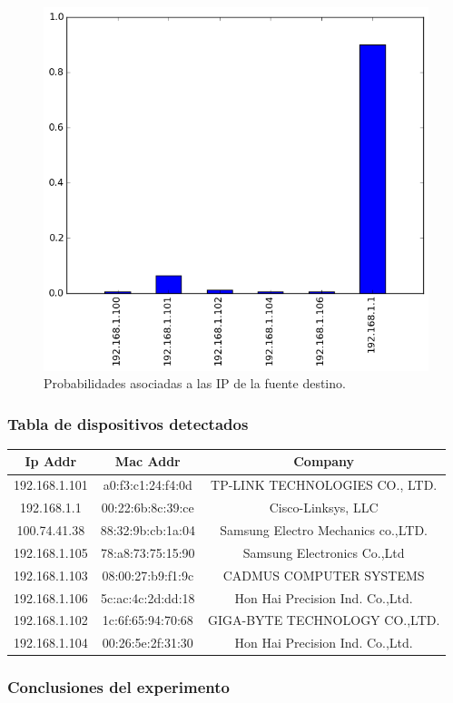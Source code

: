 \begin{figure}[h!]
  \centering
	\includegraphics[scale=0.66]{../experimentacion-svilerino/casa/histogram_dst_probabilities.png}
  \caption{Probabilidades asociadas a las IP de la fuente destino.}
\end{figure}

\subsubsection{Tabla de dispositivos detectados}
\begin{tabular}{ |c|c|c| }
	\hline
	Ip Addr & Mac Addr & Company \\	
	\hline
	192.168.1.101 & a0:f3:c1:24:f4:0d & TP-LINK TECHNOLOGIES CO., LTD. \\
	\hline
	192.168.1.1 & 00:22:6b:8c:39:ce & Cisco-Linksys, LLC \\
	\hline
	100.74.41.38 & 88:32:9b:cb:1a:04 & Samsung Electro Mechanics co.,LTD. \\
	\hline
	192.168.1.105 & 78:a8:73:75:15:90 & Samsung Electronics Co.,Ltd \\
	\hline
	192.168.1.103 & 08:00:27:b9:f1:9c & CADMUS COMPUTER SYSTEMS \\
	\hline
	192.168.1.106 & 5c:ac:4c:2d:dd:18 & Hon Hai Precision Ind. Co.,Ltd. \\
	\hline
	192.168.1.102 & 1c:6f:65:94:70:68 & GIGA-BYTE TECHNOLOGY CO.,LTD. \\
	\hline
	192.168.1.104 & 00:26:5e:2f:31:30 & Hon Hai Precision Ind. Co.,Ltd. \\
	\hline
\end{tabular}

\subsubsection{Conclusiones del experimento}
